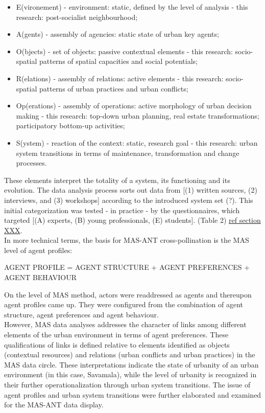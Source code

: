 \documentclass[11pt]{report}
\begin{document}
\begin{itemize}
\item E(vironement) - environment: static, defined by the level of analysis - this research: post-socialist neighbourhood;
\item A(gents) - assembly of agencies: static state of urban key agents;
\item O(bjects) - set of objects: passive contextual elements - this research: socio-spatial patterns of spatial capacities and social potentials;
\item R(elations) - assembly of relations: active elements - this research: socio-spatial patterns of urban practices and urban conflicts;
\item Op(erations) - assembly of operations: active morphology of urban decision making - this research: top-down urban planning, real estate transformations; participatory bottom-up activities;
\item S(ystem) - reaction of the context: static, research goal - this research:  urban system transitions in terms of maintenance, transformation and change processes.
\end{itemize}

These elements interpret the totality of a system, its functioning and its evolution.
The data analysis process sorts out data from [(1) written sources, (2) interviews, and (3) workshops] according to the introduced system set (?).
This initial categorization was tested - in practice - by the questionnaires, which targeted [(A) experts, (B) young professionals, (E) students].
 (Table 2) \href{ref}{ref section XXX}.
\\
In more technical terms, the basis for MAS-ANT cross-pollination is the MAS level of agent profiles:

AGENT PROFILE = AGENT STRUCTURE + AGENT PREFERENCES + AGENT BEHAVIOUR

On the level of MAS method, actors were readdressed as agents and thereupon agent profiles came up. They were configured from the combination of agent structure, agent preferences and agent behaviour.
\\
However, MAS data analyses addresses the character of links among different elements of the urban environment in terms of agent preferences. These qualifications of links is defined relative to elements identified as objects (contextual resources) and relations (urban conflicts and urban practices) in the MAS data circle. These interpretations indicate the state of urbanity of an urban environment (in this case, Savamala), while the level of urbanity is recognized in their further operationalization through urban system transitions.
The issue of agent profiles and urban system transitions were further elaborated and examined for the MAS-ANT data display.
\end{document}

